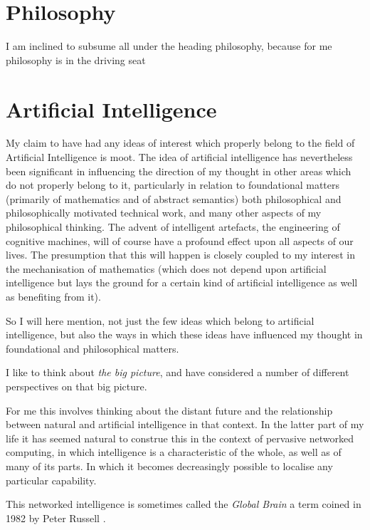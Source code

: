 
\chapter{Philosophy}

I am inclined to subsume all under the heading philosophy, because for me philosophy is in the driving seat 

\chapter{Artificial Intelligence}

My claim to have had any ideas of interest which properly belong to the field of Artificial Intelligence is moot.
The idea of artificial intelligence has nevertheless been significant in influencing the direction of my thought in other areas which do not properly belong to it, particularly in relation to foundational matters (primarily of mathematics and of abstract semantics) both philosophical and philosophically motivated technical work, and many other aspects of my philosophical thinking.
The advent of intelligent artefacts, the engineering of cognitive machines, will of course have a profound effect upon all aspects of our lives.
The presumption that this will happen is closely coupled to my interest in the mechanisation of mathematics (which does not depend upon artificial intelligence but lays the ground for a certain kind of artificial intelligence as well as benefiting from it).

So I will here mention, not just the few ideas which belong to artificial intelligence, but also the ways in which these ideas have influenced my thought in foundational and philosophical matters.

I like to think about {\it the big picture}, and have considered a number of different perspectives on that big picture.
 
For me this involves thinking about the distant future and the relationship between natural and artificial intelligence in that context.
In the latter part of my life it has seemed natural to construe this in the context of pervasive networked computing, in which intelligence is a characteristic of the whole, as well as of many of its parts.
In which it becomes decreasingly possible to localise any particular capability.

This networked intelligence is sometimes called the {\it Global Brain} a term coined in 1982 by Peter Russell \cite{russellp82}.

